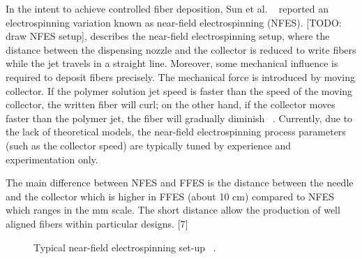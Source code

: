 \documentclass[5p,,preprint,12pt,twocolumn]{elsarticle}
\makeatletter
\def\fixFloatSize#1{}%
\makeatother
\begin{document}
In the intent to achieve controlled fiber deposition, Sun et al. \unskip~\cite{527120:11974321} reported an electrospinning variation known as near-field electrospinning (NFES). [TODO: draw NFES setup], describes the near-field electrospinning setup, where the distance between the dispensing nozzle and the collector is reduced to write fibers while the jet travels in a straight line. Moreover, some mechanical influence is required to deposit fibers precisely. The mechanical force is introduced by moving collector. If the polymer solution jet speed is faster than the speed of the moving collector, the written fiber will curl; on the other hand, if the collector moves faster than the polymer jet, the fiber will gradually diminish \unskip~\cite{527120:11974327,527120:11974326}. Currently, due to the lack of theoretical models, the near-field electrospinning process parameters (such as the collector speed) are typically tuned by experience and experimentation only.

The main difference between NFES and FFES is the distance between the needle and the collector which is higher in FFES (about 10 cm) compared to NFES which ranges in the mm scale. The short distance allow the production of well aligned fibers within particular designs. [7]


\bgroup
\fixFloatSize{images/461590fc-21b9-4974-88ef-bdfb00006f73-udrf_nfes.jpg}
\begin{figure}[!htbp]
\centering \makeatletter{}
\makeatother 
\caption{{Typical near-field electrospinning set-up \unskip~\protect\cite{527120:11973130}.}}
\label{f-8e5a75d9ba17}
\end{figure}
\egroup
\end{document}

